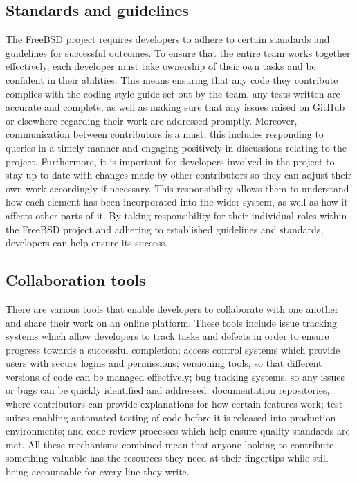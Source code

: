 \documentclass[12pt, dvipsnames, a4paper]{article}
\begin{document}
\subsection{Standards and guidelines}
The FreeBSD project requires developers to adhere to certain standards and guidelines for successful outcomes. To ensure that the entire team works together effectively, each developer must take ownership of their own tasks and be confident in their abilities. This means ensuring that any code they contribute complies with the coding style guide set out by the team, any tests written are accurate and complete, as well as making sure that any issues raised on GitHub or elsewhere regarding their work are addressed promptly. Moreover, communication between contributors is a must; this includes responding to queries in a timely manner and engaging positively in discussions relating to the project. Furthermore, it is important for developers involved in the project to stay up to date with changes made by other contributors so they can adjust their own work accordingly if necessary. This responsibility allows them to understand how each element has been incorporated into the wider system, as well as how it affects other parts of it. By taking responsibility for their individual roles within the FreeBSD project and adhering to established guidelines and standards, developers can help ensure its success.
\subsection{Collaboration tools}
There are various tools that enable developers to collaborate with one another and share their work on an online platform. These tools include issue tracking systems which allow developers to track tasks and defects in order to ensure progress towards a successful completion; access control systems which provide users with secure logins and permissions; versioning tools, so that different versions of code can be managed effectively; bug tracking systems, so any issues or bugs can be quickly identified and addressed; documentation repositories, where contributors can provide explanations for how certain features work; test suites enabling automated testing of code before it is released into production environments; and code review processes which help ensure quality standards are met. All these mechanisms combined mean that anyone looking to contribute something valuable has the resources they need at their fingertips while still being accountable for every line they write.
\end{document}
